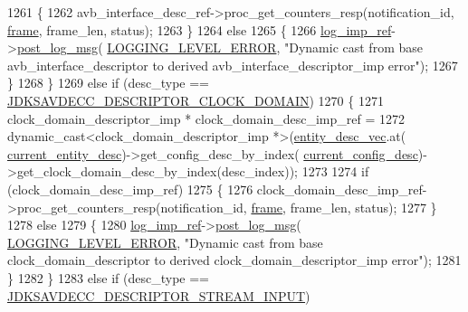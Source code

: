 \begin{DoxyCode}
{{1261             \{
1262                 avb\_interface\_desc\_ref->proc\_get\_counters\_resp(notification\_id, 
      \hyperlink{gst__avb__playbin_8c_ac8e710e0b5e994c0545d75d69868c6f0}{frame}, frame\_len, status);
1263             \}
1264             \textcolor{keywordflow}{else}
1265             \{
1266                 \hyperlink{namespaceavdecc__lib_acbe3e2a96ae6524943ca532c87a28529}{log\_imp\_ref}->\hyperlink{classavdecc__lib_1_1log_a68139a6297697e4ccebf36ccfd02e44a}{post\_log\_msg}(
      \hyperlink{namespaceavdecc__lib_a501055c431e6872ef46f252ad13f85cdaf2c4481208273451a6f5c7bb9770ec8a}{LOGGING\_LEVEL\_ERROR}, \textcolor{stringliteral}{"Dynamic cast from base avb\_interface\_descriptor to derived
       avb\_interface\_descriptor\_imp error"});
1267             \}
1268         \}
1269         \textcolor{keywordflow}{else} \textcolor{keywordflow}{if} (desc\_type == \hyperlink{group__descriptor_ga589df1006298ffeb54b5c7e5a831b062}{JDKSAVDECC\_DESCRIPTOR\_CLOCK\_DOMAIN})
1270         \{
1271             clock\_domain\_descriptor\_imp * clock\_domain\_desc\_imp\_ref =
1272                 \textcolor{keyword}{dynamic\_cast<}clock\_domain\_descriptor\_imp *\textcolor{keyword}{>}(\hyperlink{classavdecc__lib_1_1end__station__imp_a72edab41bc56e3c1757944a7df188a3d}{entity\_desc\_vec}.at(
      \hyperlink{classavdecc__lib_1_1end__station__imp_afd78c89df26ba7641e1adb764c0e827d}{current\_entity\_desc})->get\_config\_desc\_by\_index(
      \hyperlink{classavdecc__lib_1_1end__station__imp_a60b1af40d35e8a86b0082c54ab6cb6a8}{current\_config\_desc})->get\_clock\_domain\_desc\_by\_index(desc\_index));
1273 
1274             \textcolor{keywordflow}{if} (clock\_domain\_desc\_imp\_ref)
1275             \{
1276                 clock\_domain\_desc\_imp\_ref->proc\_get\_counters\_resp(notification\_id, 
      \hyperlink{gst__avb__playbin_8c_ac8e710e0b5e994c0545d75d69868c6f0}{frame}, frame\_len, status);
1277             \}
1278             \textcolor{keywordflow}{else}
1279             \{
1280                 \hyperlink{namespaceavdecc__lib_acbe3e2a96ae6524943ca532c87a28529}{log\_imp\_ref}->\hyperlink{classavdecc__lib_1_1log_a68139a6297697e4ccebf36ccfd02e44a}{post\_log\_msg}(
      \hyperlink{namespaceavdecc__lib_a501055c431e6872ef46f252ad13f85cdaf2c4481208273451a6f5c7bb9770ec8a}{LOGGING\_LEVEL\_ERROR}, \textcolor{stringliteral}{"Dynamic cast from base clock\_domain\_descriptor to derived
       clock\_domain\_descriptor\_imp error"});
1281             \}
1282         \}
1283         \textcolor{keywordflow}{else} \textcolor{keywordflow}{if} (desc\_type == \hyperlink{group__descriptor_ga4eb0b7597f11b5fc36f3625acd82e503}{JDKSAVDECC\_DESCRIPTOR\_STREAM\_INPUT})
}}
\end{DoxyCode}
